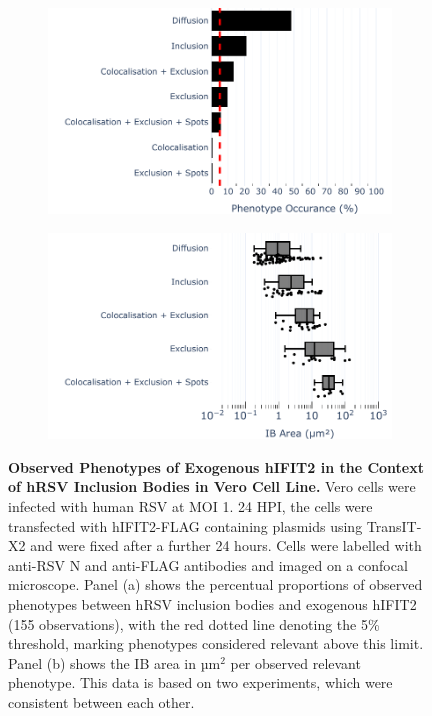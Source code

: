 \begin{figure}
    \begin{subfigure}{0.495\textwidth}
        \caption{}
        \includegraphics[width=1\linewidth]{09. Chapter 4/Figs/02. Overexpression/02. IFIT2/01. bar_hi2f_hrsv.pdf} 
    \end{subfigure}
    \begin{subfigure}{0.495\textwidth}
        \caption{}
        \includegraphics[width=1\linewidth]{09. Chapter 4/Figs/02. Overexpression/02. IFIT2/02. box_hi2f_hrsv.pdf}
    \end{subfigure}
    \caption[Observed Phenotypes of Exogenous hIFIT2 in the Context of hRSV Inclusion Bodies in Vero Cell Line.]{\textbf{Observed Phenotypes of Exogenous hIFIT2 in the Context of hRSV Inclusion Bodies in Vero Cell Line.} Vero cells were infected with human RSV at MOI 1. 24 HPI, the cells were transfected with hIFIT2-FLAG containing plasmids using TransIT-X2 and were fixed after a further 24 hours. Cells were labelled with anti-RSV N and anti-FLAG antibodies and imaged on a confocal microscope. Panel (a) shows the percentual proportions of observed phenotypes between hRSV inclusion bodies and exogenous hIFIT2 (155 observations), with the red dotted line denoting the 5\% threshold, marking phenotypes considered relevant above this limit. Panel (b) shows the IB area in \(\mbox{µm}^2\) per observed relevant phenotype. This data is based on two experiments, which were consistent between each other.}
    \label{fig:Observed Phenotypes of Exogenous hIFIT2 in the Context of hRSV Inclusion Bodies in Vero Cell Line}
\end{figure}

